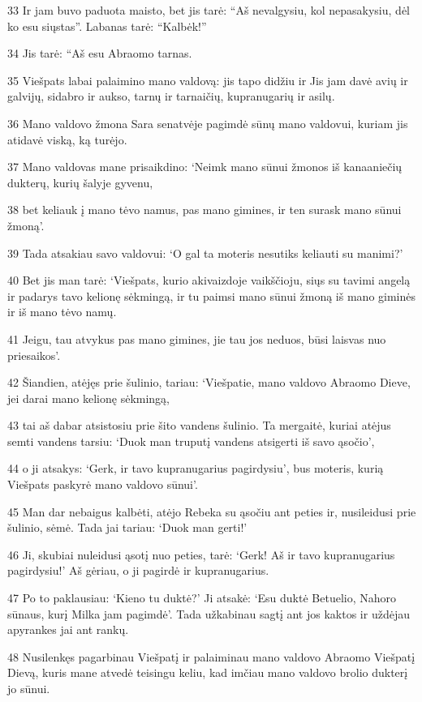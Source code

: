 \par 33 Ir jam buvo paduota maisto, bet jis tarė: “Aš nevalgysiu, kol nepasakysiu, dėl ko esu siųstas”. Labanas tarė: “Kalbėk!” 
\par 34 Jis tarė: “Aš esu Abraomo tarnas. 
\par 35 Viešpats labai palaimino mano valdovą: jis tapo didžiu ir Jis jam davė avių ir galvijų, sidabro ir aukso, tarnų ir tarnaičių, kupranugarių ir asilų. 
\par 36 Mano valdovo žmona Sara senatvėje pagimdė sūnų mano valdovui, kuriam jis atidavė viską, ką turėjo. 
\par 37 Mano valdovas mane prisaikdino: ‘Neimk mano sūnui žmonos iš kanaaniečių dukterų, kurių šalyje gyvenu, 
\par 38 bet keliauk į mano tėvo namus, pas mano gimines, ir ten surask mano sūnui žmoną’. 
\par 39 Tada atsakiau savo valdovui: ‘O gal ta moteris nesutiks keliauti su manimi?’ 
\par 40 Bet jis man tarė: ‘Viešpats, kurio akivaizdoje vaikščioju, siųs su tavimi angelą ir padarys tavo kelionę sėkmingą, ir tu paimsi mano sūnui žmoną iš mano giminės ir iš mano tėvo namų. 
\par 41 Jeigu, tau atvykus pas mano gimines, jie tau jos neduos, būsi laisvas nuo priesaikos’. 
\par 42 Šiandien, atėjęs prie šulinio, tariau: ‘Viešpatie, mano valdovo Abraomo Dieve, jei darai mano kelionę sėkmingą, 
\par 43 tai aš dabar atsistosiu prie šito vandens šulinio. Ta mergaitė, kuriai atėjus semti vandens tarsiu: ‘Duok man truputį vandens atsigerti iš savo ąsočio’, 
\par 44 o ji atsakys: ‘Gerk, ir tavo kupranugarius pagirdysiu’, bus moteris, kurią Viešpats paskyrė mano valdovo sūnui’. 
\par 45 Man dar nebaigus kalbėti, atėjo Rebeka su ąsočiu ant peties ir, nusileidusi prie šulinio, sėmė. Tada jai tariau: ‘Duok man gerti!’ 
\par 46 Ji, skubiai nuleidusi ąsotį nuo peties, tarė: ‘Gerk! Aš ir tavo kupranugarius pagirdysiu!’ Aš gėriau, o ji pagirdė ir kupranugarius. 
\par 47 Po to paklausiau: ‘Kieno tu duktė?’ Ji atsakė: ‘Esu duktė Betuelio, Nahoro sūnaus, kurį Milka jam pagimdė’. Tada užkabinau sagtį ant jos kaktos ir uždėjau apyrankes jai ant rankų. 
\par 48 Nusilenkęs pagarbinau Viešpatį ir palaiminau mano valdovo Abraomo Viešpatį Dievą, kuris mane atvedė teisingu keliu, kad imčiau mano valdovo brolio dukterį jo sūnui. 
